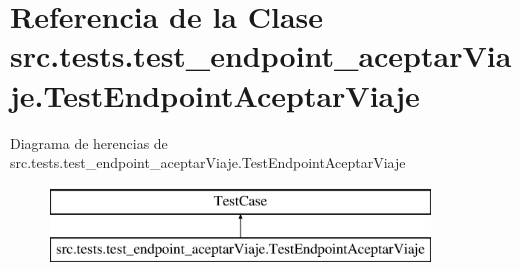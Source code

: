 \hypertarget{classsrc_1_1tests_1_1test__endpoint__aceptar_viaje_1_1_test_endpoint_aceptar_viaje}{\section{Referencia de la Clase src.\-tests.\-test\-\_\-endpoint\-\_\-aceptar\-Viaje.\-Test\-Endpoint\-Aceptar\-Viaje}
\label{classsrc_1_1tests_1_1test__endpoint__aceptar_viaje_1_1_test_endpoint_aceptar_viaje}
}
Diagrama de herencias de src.\-tests.\-test\-\_\-endpoint\-\_\-aceptar\-Viaje.\-Test\-Endpoint\-Aceptar\-Viaje\begin{figure}[H]
\begin{center}
\leavevmode
\includegraphics[height=2.000000cm]{classsrc_1_1tests_1_1test__endpoint__aceptar_viaje_1_1_test_endpoint_aceptar_viaje}
\end{center}
\end{figure}
